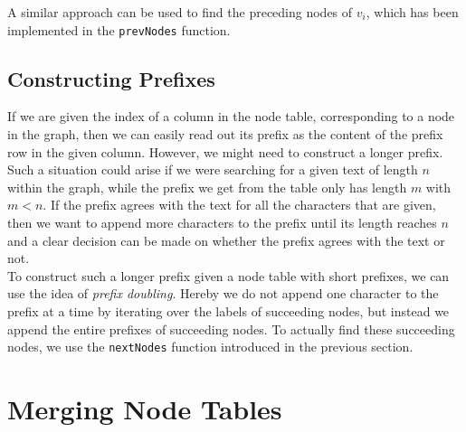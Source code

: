 \documentclass[a4paper,12pt,twoside,BCOR=10mm]{scrbook}
\begin{document}
A similar approach can be used to find the preceding nodes of $ v_i $, 
which has been implemented in the \texttt{prevNodes} function.


\subsection{Constructing Prefixes}

If we are given the index of a column in the node table, corresponding to a node in the graph, 
then we can easily read out its prefix as the content of the prefix row in the given column. 
However, we might need to construct a longer prefix. 
Such a situation could arise if we were searching for a given text of length $ n $ within the 
graph, while the prefix we get from the table only has length $ m $ with $ m < n $. 
If the prefix agrees with the text for all the characters that are given, then we want to 
append more characters to the prefix until its length reaches $ n $ and a clear decision can 
be made on whether the prefix agrees with the text or not. \\
To construct such a longer prefix given a node table with short prefixes, we can use the 
idea of \textit{prefix doubling}. 
Hereby we do not append one character to the prefix at a time by iterating over the labels of succeeding nodes, 
but instead we append the entire prefixes of succeeding nodes. 
To actually find these succeeding nodes, we use the \texttt{nextNodes} function introduced in the previous section.


% 

\section{Merging Node Tables}
\label{sec:gml_merging_node_tables}
%
\end{document}
